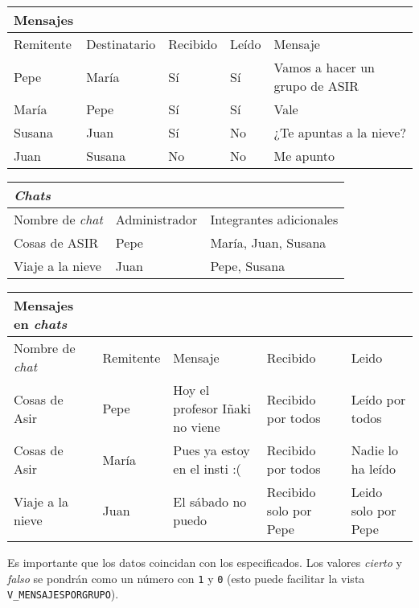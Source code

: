 \documentclass[a4paper]{article}
\begin{document}
\begin{center}
\begin{tabular}{|l|l|l|l|l|}
\hline
\textbf{Mensajes} &  &  &  & \\[0pt]
\hline
Remitente & Destinatario & Recibido & Leído & Mensaje\\[0pt]
\hline
Pepe & María & Sí & Sí & Vamos a hacer un grupo de ASIR\\[0pt]
María & Pepe & Sí & Sí & Vale\\[0pt]
Susana & Juan & Sí & No & ¿Te apuntas a la nieve?\\[0pt]
Juan & Susana & No & No & Me apunto\\[0pt]
\hline
\end{tabular}
\end{center}

\begin{center}
\begin{tabular}{|l|l|l|}
\hline
\textbf{\emph{Chats}} &  & \\[0pt]
\hline
Nombre de \emph{chat} & Administrador & Integrantes adicionales\\[0pt]
\hline
Cosas de ASIR & Pepe & María, Juan, Susana\\[0pt]
Viaje a la nieve & Juan & Pepe, Susana\\[0pt]
\hline
\end{tabular}
\end{center}

\begin{center}
\begin{tabular}{|l|l|l|l|l|}
\hline
\textbf{Mensajes en \emph{chats}} &  &  &  & \\[0pt]
\hline
Nombre de \emph{chat} & Remitente & Mensaje & Recibido & Leido\\[0pt]
\hline
Cosas de Asir & Pepe & Hoy el profesor Iñaki no viene & Recibido por todos & Leído por todos\\[0pt]
Cosas de Asir & María & Pues ya estoy en el insti :( & Recibido por todos & Nadie lo ha leído\\[0pt]
Viaje a la nieve & Juan & El sábado no puedo & Recibido solo por Pepe & Leido solo por Pepe\\[0pt]
\hline
\end{tabular}
\end{center}

Es importante que los datos coincidan con los especificados. Los valores \emph{cierto} y \emph{falso} se pondrán como un número con \texttt{1} y \texttt{0} (esto puede facilitar la vista \texttt{V\_MENSAJESPORGRUPO}).
\end{document}
